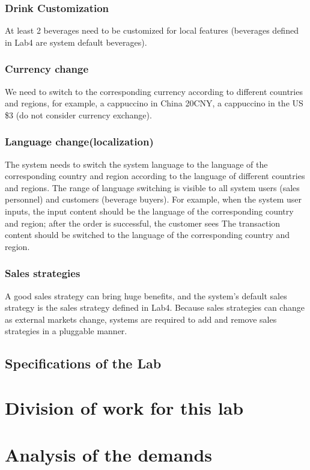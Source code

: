 \documentclass[a4paper]{report}
\begin{document}
\subsection{Drink Customization}
At least 2 beverages need to be customized for local features (beverages defined in Lab4 are system default beverages).
\subsection{Currency change}
We need to switch to the corresponding currency according to different countries and regions, for example, a cappuccino in China 20CNY, a cappuccino in the US \$3 (do not consider currency exchange).
\subsection{Language change(localization)}
The system needs to switch the system language to the language of the corresponding country and region according to the language of different countries and regions. The range of language switching is visible to all system users (sales personnel) and customers (beverage buyers). For example, when the system user inputs, the input content should be the language of the corresponding country and region; after the order is successful, the customer sees The transaction content should be switched to the language of the corresponding country and region.
\subsection{Sales strategies}
A good sales strategy can bring huge benefits, and the system's default sales strategy is the sales strategy defined in Lab4. Because sales strategies can change as external markets change, systems are required to add and remove sales strategies in a pluggable manner.
\section{Specifications of the Lab}

\chapter{Division of work for this lab}



\chapter{Analysis of the demands}
\end{document}
